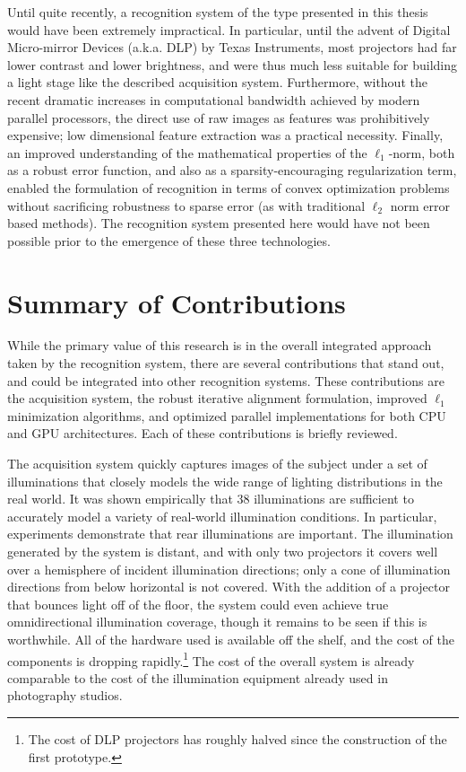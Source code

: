 Until quite recently, a recognition system of the type presented in this thesis
would have been extremely impractical.  In particular, until the advent of
Digital Micro-mirror Devices (a.k.a. DLP) by Texas Instruments, most projectors
had far lower contrast and lower brightness, and were thus much less suitable
for building a light stage like the described acquisition system.  Furthermore,
without the recent dramatic increases in computational bandwidth achieved by
modern parallel processors, the direct use of raw images as features was
prohibitively expensive; low dimensional feature extraction was a practical
necessity.  Finally, an improved understanding of the mathematical properties
of the $\ell_1$-norm, both as a robust error function, and also as a
sparsity-encouraging regularization term, enabled the formulation of recognition in
terms of convex optimization problems without sacrificing robustness to sparse
error (as with traditional $\ell_2$ norm error based methods).  The recognition
system presented here would have not been possible prior to the emergence of
these three technologies.

\section{Summary of Contributions}
While the primary value of this research is in the overall integrated approach taken by
the recognition system, there are several contributions that stand out, and could be
integrated into other recognition systems.  These contributions
are the acquisition system, the robust iterative alignment formulation,
improved $\ell_1$ minimization algorithms, and optimized parallel
implementations for both CPU and GPU architectures.  Each of these
contributions is briefly reviewed.

The acquisition system quickly captures images of the subject under a set of
illuminations that closely models the wide range of lighting distributions in
the real world.  It was shown empirically that 38 illuminations are sufficient
to accurately model a variety of real-world illumination conditions.  In
particular, experiments demonstrate that rear illuminations are important.  The
illumination generated by the system is distant, and with only two projectors
it covers well over a hemisphere of incident illumination directions; only a
cone of illumination directions from below horizontal is not covered.  With the
addition of a projector that bounces light off of the floor, the system could
even achieve true omnidirectional illumination coverage, though it remains to
be seen if this is worthwhile.  All of the hardware used is available off the
shelf, and the cost of the components is dropping rapidly.\footnote{The cost of
DLP projectors has roughly halved since the construction of the first
prototype.} The cost of the overall system is already comparable to the cost of
the illumination equipment already used in photography studios.  

